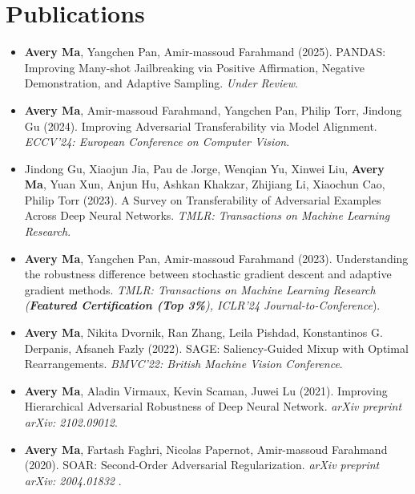 \section*{Publications}
    \vspace{\postsubhead}
    \begin{adjustwidth}{\indentleft}{\indentright}
        \begin{itemize}
            \setlength\itemsep{0.6em}

            \item \textbf{Avery Ma}, Yangchen Pan, Amir-massoud Farahmand (2025). PANDAS: Improving Many-shot Jailbreaking via Positive Affirmation, Negative Demonstration, and Adaptive Sampling. \emph{Under Review}.
            
            \item \textbf{Avery Ma}, Amir-massoud Farahmand, Yangchen Pan, Philip Torr, Jindong Gu (2024). Improving Adversarial Transferability via Model Alignment. \emph{ECCV'24: European Conference on Computer Vision}.

            \item Jindong Gu, Xiaojun Jia, Pau de Jorge, Wenqian Yu, Xinwei Liu, \textbf{Avery Ma}, Yuan Xun, Anjun Hu, Ashkan Khakzar, Zhijiang Li, Xiaochun Cao, Philip Torr (2023). A Survey on Transferability of Adversarial Examples Across Deep Neural Networks. \emph{TMLR: Transactions on Machine Learning Research}.
            
            \item \textbf{Avery Ma}, Yangchen Pan, Amir-massoud Farahmand (2023). Understanding the robustness difference between stochastic gradient descent and adaptive gradient methods. \emph{TMLR: Transactions on Machine Learning Research (\textbf{Featured Certification (Top 3\%}), ICLR'24 Journal-to-Conference}).
            
            \item \textbf{Avery Ma}, Nikita Dvornik, Ran Zhang, Leila Pishdad, Konstantinos G. Derpanis, Afsaneh Fazly (2022). SAGE: Saliency-Guided Mixup with Optimal Rearrangements. \emph{BMVC'22: British Machine Vision Conference}.
            
            \item \textbf{Avery Ma}, Aladin Virmaux, Kevin Scaman, Juwei Lu (2021). Improving Hierarchical Adversarial Robustness of Deep Neural Network. \emph{arXiv preprint arXiv: 2102.09012}.
            
            \item \textbf{Avery Ma}, Fartash Faghri, Nicolas Papernot, Amir-massoud Farahmand (2020). SOAR: Second-Order Adversarial Regularization. \emph{arXiv preprint arXiv: 2004.01832} .
            

\end{itemize}
\end{adjustwidth}
